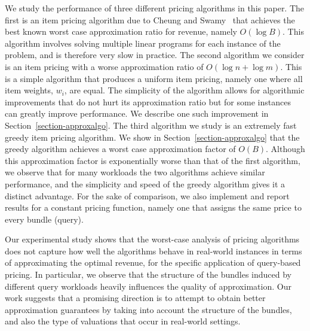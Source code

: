 We study the performance of three different pricing algorithms in this paper. The first is an item pricing algorithm due to Cheung and Swamy~\cite{cheung2008approximation} that achieves the best known worst case approximation ratio for revenue, namely $O(\log B)$. This algorithm involves solving multiple linear programs for each instance of the problem, and is therefore very slow in practice. The second algorithm we consider is an item pricing with a worse approximation ratio of $O(\log n+\log m)$. This is a simple algorithm that produces a uniform item pricing, namely one where all item weights, $w_i$, are equal. The simplicity of the algorithm allows for algorithmic improvements that do not hurt its approximation ratio but for some instances can greatly improve performance. We describe one such improvement in Section~\ref{section-approxalgo}. The third algorithm we study is an extremely fast greedy item pricing algorithm. We show in Section~\ref{section-approxalgo} that the greedy algorithm achieves a worst case approximation factor of $O(B)$. Although this approximation factor is exponentially worse than that of the first algorithm, we observe that for many workloads the two algorithms achieve similar performance, and the simplicity and speed of the greedy algorithm gives it a distinct advantage. For the sake of comparison, we also implement and report results for a constant pricing function, namely one that assigns the same price to every bundle (query). 

Our experimental study shows that the worst-case analysis of pricing algorithms does not capture how well the algorithms behave in real-world instances in terms of approximating the optimal revenue, for the specific application of query-based pricing. In particular, we observe that the structure of the bundles induced by different query workloads heavily influences the quality of approximation. Our work suggests that a promising direction is to attempt to obtain better approximation guarantees by taking into account the structure of the bundles, and also the type of valuations that occur in real-world settings.

